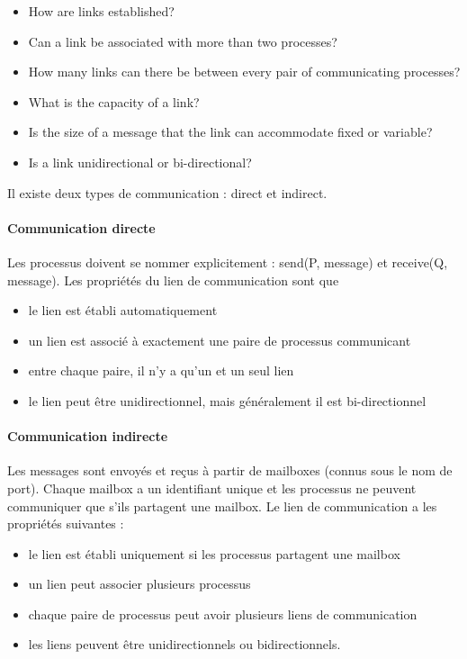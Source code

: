 	\begin{itemize}
		\item How are links established?
		\item Can a link be associated with more than two processes?
		\item How many links can there be between every pair of communicating processes?
		\item What is the capacity of a link?
		\item Is the size of a message that the link can accommodate fixed or variable?
		\item Is a link unidirectional or bi-directional?
	\end{itemize}

	Il existe deux types de communication : direct et indirect.
	
	\paragraph{Communication directe} Les processus doivent se nommer explicitement : send(P, message) et receive(Q, message). Les propriétés du lien de communication sont que
	
	\begin{itemize}
		\item le lien est établi automatiquement
		\item un lien est associé à exactement une paire de processus communicant
		\item entre chaque paire, il n'y a qu'un et un seul lien
		\item le lien peut être unidirectionnel, mais généralement il est bi-directionnel
	\end{itemize}
	
	\paragraph{Communication indirecte} Les messages sont envoyés et reçus à partir de mailboxes (connus sous le nom de port). Chaque mailbox a un identifiant unique et les processus ne peuvent communiquer que s'ils partagent une mailbox. Le lien de communication a les propriétés suivantes :
	
	\begin{itemize}
		\item le lien est établi uniquement si les processus partagent une mailbox
		\item un lien peut associer plusieurs processus
		\item chaque paire de processus peut avoir plusieurs liens de communication
		\item les liens peuvent être unidirectionnels ou bidirectionnels.
	\end{itemize}
	
